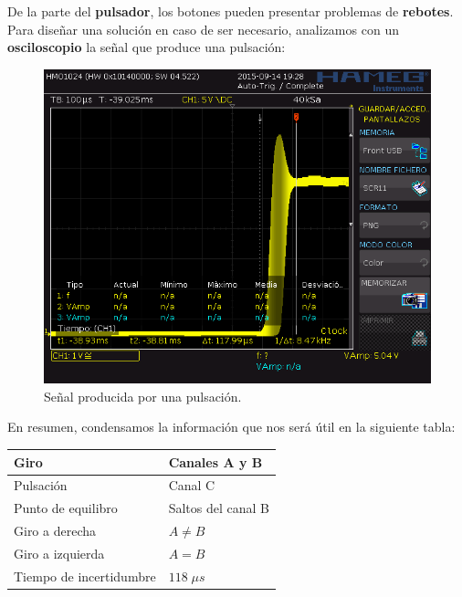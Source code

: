 De la parte del \textbf{pulsador}, los botones pueden presentar problemas de \textbf{rebotes}. Para diseñar una solución en caso de ser necesario, analizamos con un \textbf{osciloscopio} la señal que produce una pulsación:

\smallskip

\begin{figure}[H]
	\noindent \begin{centering}
		\includegraphics[width=\linewidth*2/3]{capitulo3/rebotes}
		\par\end{centering}
	\smallskip
	\caption{\label{fig:rebotes} Señal producida por una pulsación.}
\end{figure} 

\smallskip

En resumen, condensamos la información que nos será útil en la siguiente tabla:

\smallskip

\begin{center}
	\begin{tabular}{|l|l|}
		\hline Giro & Canales A y B \\ 
		\hline Pulsación & Canal C \\ 
		\hline Punto de equilibro & Saltos del canal B \\ 
		\hline Giro a derecha & $A\neq B$ \\ 
		\hline Giro a izquierda & $A=B$ \\
		\hline Tiempo de incertidumbre & $118 \; \mu s$\\
		\hline 
	\end{tabular}
	\smallskip
\end{center} 

